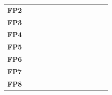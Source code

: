 \begin{table}
\begin{tabularx}{\textwidth}{ c *{12}{Y} }
    \textbf{FP2}  &                                   &                                       &                                         &                                           &                                        &                                         &             &            &             &            &             &            \\
    \textbf{FP3}  &                                   &                                       &                                         &                                           &                                        &                                         &             &            &             &            &             &            \\
    \textbf{FP4}  &                                   &                                       &                                         &                                           &                                        &                                         &             &            &             &            &             &            \\
    \textbf{FP5}  &                                   &                                       &                                         &                                           &                                        &                                         &             &            &             &            &             &            \\
    \textbf{FP6}  &                                   &                                       &                                         &                                           &                                        &                                         &             &            &             &            &             &            \\
    \textbf{FP7}  &                                   &                                       &                                         &                                           &                                        &                                         &             &            &             &            &             &            \\
    \textbf{FP8}  &                                   &                                       &                                         &                                           &                                        &                                         &             &            &             &            &             &            \\

\end{tabularx}
\end{table}
